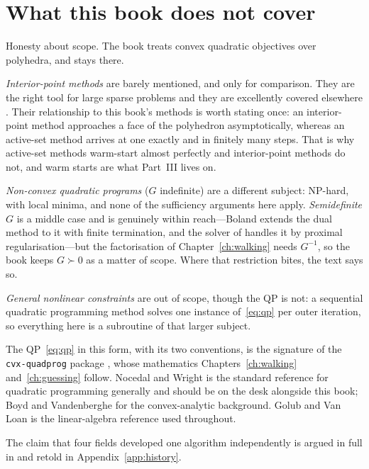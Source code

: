\section{What this book does not cover}

Honesty about scope. The book treats convex quadratic objectives over polyhedra,
and stays there.

\emph{Interior-point methods} are barely mentioned, and only for comparison. They
are the right tool for large sparse problems and they are excellently covered
elsewhere \cite{nocedal2006,boyd2004}. Their relationship to this book's methods is
worth stating once: an interior-point method approaches a face of the polyhedron
asymptotically, whereas an active-set method arrives at one exactly and in finitely
many steps. That is why active-set methods warm-start almost perfectly and
interior-point methods do not, and warm starts are what Part~III lives on.

\emph{Non-convex quadratic programs} ($G$ indefinite) are a different subject:
NP-hard, with local minima, and none of the sufficiency arguments here apply.
\emph{Semidefinite $G$} is a middle case and is genuinely within reach---Boland
\cite{boland1997} extends the dual method to it with finite termination, and the
solver of \cite{arnstrom2022daqp} handles it by proximal regularisation---but the
factorisation of Chapter~\ref{ch:walking} needs $G^{-1}$, so the book keeps
$G \succ 0$ as a matter of scope. Where that restriction bites, the text says so.

\emph{General nonlinear constraints} are out of scope, though the QP is not: a
sequential quadratic programming method solves one instance of~\eqref{eq:qp} per
outer iteration, so everything here is a subroutine of that larger subject.

\begin{notes}
The QP~\eqref{eq:qp} in this form, with its two conventions, is the signature of
the \texttt{cvx-quadprog} package \cite{cvxquadprog}, whose mathematics
Chapters~\ref{ch:walking} and~\ref{ch:guessing} follow. Nocedal and Wright
\cite[Ch.~16]{nocedal2006} is the standard reference for quadratic programming
generally and should be on the desk alongside this book; Boyd and Vandenberghe
\cite{boyd2004} for the convex-analytic background. Golub and Van Loan
\cite{golub2013} is the linear-algebra reference used throughout.

The claim that four fields developed one algorithm independently is argued in
full in \cite{schmelzer2026perspective} and retold in Appendix~\ref{app:history}.
\end{notes}

